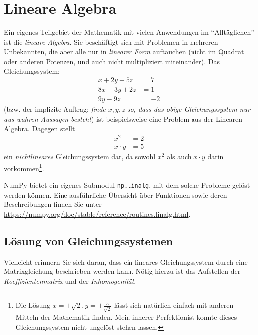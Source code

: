 \section{Lineare Algebra}
Ein eigenes Teilgebiet der Mathematik mit vielen Anwendungen im \enquote{Alltäglichen} ist die \emph{lineare Algebra}. Sie beschäftigt sich mit Problemen in mehreren Unbekannten, die aber alle nur in \emph{linearer Form} auftauchen (\ie nicht im Quadrat oder anderen Potenzen, und auch nicht multipliziert miteinander). Das Gleichungssystem:
\begin{align*}
	 x + 2y - 5z &=  7 \\
	8x - 3y + 2z &=  1 \\
	     9y - 9z &= -2
\end{align*}
(bzw. der implizite Auftrag: \emph{finde $x, y, z$ so, dass das obige Gleichungssystem nur aus wahren Aussagen besteht}) ist beispielsweise eine Problem aus der Linearen Algebra. Dagegen stellt
\begin{align*}
	x^2 &= 2 \\
	x \cdot y &= 5
\end{align*}
ein \emph{nichtlineares} Gleichungssystem dar, da sowohl $x^2$ als auch $x \cdot y$ darin vorkommen\footnote{Die Lösung $x = \pm \sqrt{2}, y = \pm \frac{5}{\sqrt{2}}$ lässt sich natürlich einfach mit anderen Mitteln der Mathematik finden. Mein innerer Perfektionist konnte dieses Gleichungssystem nicht ungelöst stehen lassen.}.

NumPy bietet ein eigenes Submodul \texttt{np.linalg}, mit dem solche Probleme gelöst werden können. Eine ausführliche Übersicht über Funktionen sowie deren Beschreibungen finden Sie unter \url{https://numpy.org/doc/stable/reference/routines.linalg.html}.

\subsection{Lösung von Gleichungssystemen}
Vielleicht erinnern Sie sich daran, dass ein lineares Gleichungssystem durch eine Matrixgleichung beschrieben werden kann. Nötig hierzu ist das Aufstellen der \emph{Koeffizientenmatrix} und der \emph{Inhomogenität}.

